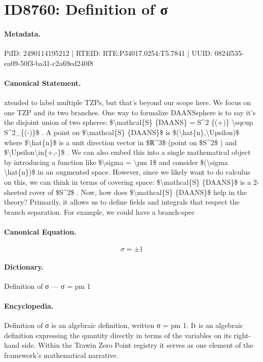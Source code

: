 \section*{ID8760: Definition of σ}
\paragraph{Metadata.}
PiID: 2490114195212 | RTEID: RTE:P34017.0254:T5.7841 | UUID: 0824f535-ea09-50f3-ba31-c2a69ed240f8

\paragraph{Canonical Statement.}
xtended to label multiple TZPs, but that’s beyond our scope here. We focus on one TZP and its two branches. One way to formalize DAANSsphere is to say it’s the disjoint union of two spheres: \$\textbackslash{}mathcal\{S\} \{DAANS\} = S\textasciicircum{}2 \{(+)\} \textbackslash{}sqcup S\textasciicircum{}2\_\{(-)\}\$ . A point on \$\textbackslash{}mathcal\{S\} \{DAANS\}\$ is \$(\textbackslash{}hat\{n\},\textbackslash{}Upsilon)\$ where \$\textbackslash{}hat\{n\}\$ is a unit direction vector in \$ℝ\textasciicircum{}3\$ (point on \$S\textasciicircum{}2\$ ) and \$\textbackslash{}Upsilon\textbackslash{}in\{+,-\}\$ . We can also embed this into a single mathematical object by introducing a function like \$\textbackslash{}sigma = \textbackslash{}pm 1\$ and consider \$(\textbackslash{}sigma \textbackslash{}hat\{n\})\$ in an augmented space. However, since we likely want to do calculus on this, we can think in terms of covering space: \$\textbackslash{}mathcal\{S\} \{DAANS\}\$ is a 2-sheeted cover of \$S\textasciicircum{}2\$ . Now, how does \$\textbackslash{}mathcal\{S\} \{DAANS\}\$ help in the theory? Primarily, it allows us to define fields and integrals that respect the branch separation. For example, we could have a branch-spec

\paragraph{Canonical Equation.}
\[
\sigma = \pm 1
\]

\paragraph{Dictionary.}
Definition of σ — σ = pm 1

\paragraph{Encyclopedia.}
Definition of σ is an algebraic definition, written σ = pm 1. It is an algebraic definition expressing the quantity directly in terms of the variables on its right-hand side. Within the Trawin Zero Point registry it serves as one element of the framework's mathematical narrative.
